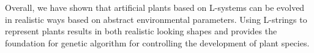 \documentclass[conference]{acmsiggraph}
\begin{document}
Overall, we have shown that artificial plants based on L-systems can be evolved
in realistic ways based on abstract environmental parameters. Using L-strings to
represent plants results in both realistic looking shapes and provides the
foundation for genetic algorithm for controlling the development of plant
species.




\end{document}
